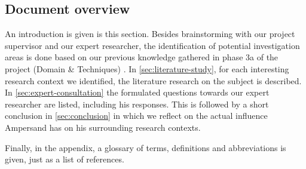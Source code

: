\subsection{Document overview}
An introduction is given is this section.
Besides brainstorming with our project supervisor and our expert researcher, the identification of potential investigation areas is done based on our previous knowledge gathered in phase 3a of the project (Domain \& Techniques) .
In \autoref{sec:literature-study}, for each interesting research context we identified, the literature research on the subject is described.
In \autoref{sec:expert-consultation} the formulated questions towards our expert researcher are listed, including his responses.
This is followed by a short conclusion in \autoref{sec:conclusion} in which we reflect on the actual influence Ampersand has on his surrounding research contexts.

Finally, in the appendix, a glossary of terms, definitions and abbreviations is given, just as a list of references.
